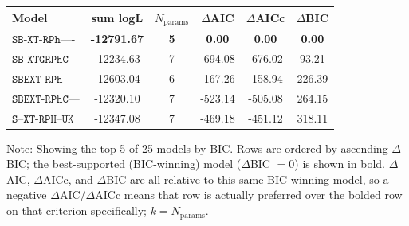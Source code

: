 \begin{tabular}{lccccc}
\toprule
Model & sum logL & $N_{\text{params}}$ & $\Delta$AIC & $\Delta$AICc & $\Delta$BIC \\
\midrule
\textbf{$\texttt{SB-XT-RPh----}$} & \textbf{-12791.67} & \textbf{5} & \textbf{0.00} & \textbf{0.00} & \textbf{0.00} \\
$\texttt{SB-XTGRPhC---}$ & -12234.63 & 7 & -694.08 & -676.02 & 93.21 \\
$\texttt{SBEXT-RPh----}$ & -12603.04 & 6 & -167.26 & -158.94 & 226.39 \\
$\texttt{SBEXT-RPhC---}$ & -12320.10 & 7 & -523.14 & -505.08 & 264.15 \\
$\texttt{S--XT-RPH--UK}$ & -12347.08 & 7 & -469.18 & -451.12 & 318.11 \\
\bottomrule
\end{tabular}
\par\footnotesize Note: Showing the top 5 of 25 models by BIC. Rows are ordered by ascending $\Delta$BIC; the best-supported (BIC-winning) model ($\Delta$BIC $= 0$) is shown in bold. $\Delta$AIC, $\Delta$AICc, and $\Delta$BIC are all relative to this same BIC-winning model, so a negative $\Delta$AIC/$\Delta$AICc means that row is actually preferred over the bolded row on that criterion specifically; $k = N_{\text{params}}$.

